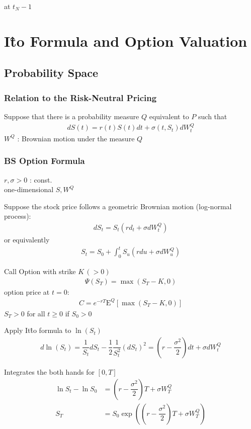 \documentclass[a4paper,11pt]{jsarticle}
\theoremstyle{definition}
\newcommand{\df}[2]{\dfrac{#1}{#2}}
\begin{document}
at $t_N-1$



\newpage
\section{I\^{t}o Formula and Option Valuation}
\subsection{Probability Space}


\subsubsection{Relation to the Risk-Neutral Pricing}
Suppose that there is a probability measure $Q$
equivalent to $P$ such that
\begin{align}
  dS(t)=r(t)S(t)dt+\sigma(t,S_t)dW_t^Q
\end{align}
$W^Q$ : Brownian motion under the measure $Q$



\subsubsection{BS Option Formula}
$r, \sigma >0$ : const. \\
one-dimensional $S, W^Q$

Suppose the stock price follows a geometric Brownian motion
(log-normal process):
\begin{align}
  dS_t=S_t(rd_t+\sigma dW_t^Q)
\end{align}
or equivalently
\begin{align}
  S_t = S_0 +\int_0^t S_u(rdu+\sigma dW_u^Q)
\end{align}

Call Option with strike $K \,(>0)$
\begin{align}
  \Psi(S_T)=\max(S_T-K,0)
\end{align}
option price at $t=0$:
\begin{align}
  C=e^{-rT}\mathrm{E}^Q[\max(S_T-K,0)]
\end{align}
$S_T>0$ for all $t\geq 0$ if $S_0>0$

Apply It\^{t}o formula to $\ln (S_t)$
\begin{align}
  d\ln(S_t)=\df{1}{S_t}dS_t-\df{1}{2}\df{1}{S_t^2}(dS_t)^2
  =\left(r-\df{\sigma^2}{2} \right)dt+\sigma dW_t^Q
\end{align}

Integrates the both hands for $[0,T]$
\begin{align}
  \ln S_t -\ln S_0
  &=\left(r-\df{\sigma^2}{2} \right)T+\sigma W_T^Q \\
  S_T&=S_0 \exp\left(
  \left(r-\df{\sigma^2}{2} \right)T+\sigma W_T^Q\right)
\end{align}
\end{document}
